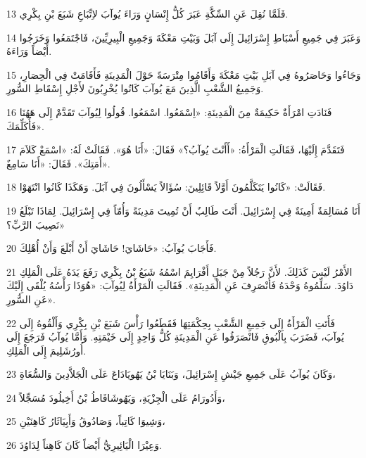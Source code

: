 \par 13 فَلَمَّا نُقِلَ عَنِ السِّكَّةِ عَبَرَ كُلُّ إِنْسَانٍ وَرَاءَ يُوآبَ لاِتِّبَاعِ شَبَعَ بْنِ بِكْرِي.
\par 14 وَعَبَرَ فِي جَمِيعِ أَسْبَاطِ إِسْرَائِيلَ إِلَى آبَلَ وَبَيْتِ مَعْكَةَ وَجَمِيعِ الْبِيرِيِّينَ، فَاجْتَمَعُوا وَخَرَجُوا أَيْضاً وَرَاءَهُ.
\par 15 وَجَاءُوا وَحَاصَرُوهُ فِي آبَلِ بَيْتِ مَعْكَةَ وَأَقَامُوا مِتْرَسَةً حَوْلَ الْمَدِينَةِ فَأَقَامَتْ فِي الْحِصَارِ، وَجَمِيعُ الشَّعْبِ الَّذِينَ مَعَ يُوآبَ كَانُوا يُخْرِبُونَ لأَجْلِ إِسْقَاطِ السُّورِ.
\par 16 فَنَادَتِ امْرَأَةٌ حَكِيمَةٌ مِنَ الْمَدِينَةِ: «اِسْمَعُوا. اسْمَعُوا. قُولُوا لِيُوآبَ تَقَدَّمْ إِلَى هَهُنَا فَأُكَلِّمَكَ».
\par 17 فَتَقَدَّمَ إِلَيْهَا، فَقَالَتِ الْمَرْأَةُ: «أَأَنْتَ يُوآبُ؟» فَقَالَ: «أَنَا هُوَ». فَقَالَتْ لَهُ: «اسْمَعْ كَلاَمَ أَمَتِكَ». فَقَالَ: «أَنَا سَامِعٌ».
\par 18 فَقَالَتْ: «كَانُوا يَتَكَلَّمُونَ أَوَّلاً قَائِلِينَ: سُؤَالاً يَسْأَلُونَ فِي آبَلَ. وَهَكَذَا كَانُوا انْتَهَوْا.
\par 19 أَنَا مُسَالِمَةٌ أَمِينَةٌ فِي إِسْرَائِيلَ. أَنْتَ طَالِبٌ أَنْ تُمِيتَ مَدِينَةً وَأُمّاً فِي إِسْرَائِيلَ. لِمَاذَا تَبْلَعُ نَصِيبَ الرَّبِّ؟»
\par 20 فَأَجَابَ يُوآبُ: «حَاشَايَ! حَاشَايَ أَنْ أَبْلَعَ وَأَنْ أُهْلِكَ.
\par 21 الأَمْرُ لَيْسَ كَذَلِكَ. لأَنَّ رَجُلاً مِنْ جَبَلِ أَفْرَايِمَ اسْمُهُ شَبَعُ بْنُ بِكْرِي رَفَعَ يَدَهُ عَلَى الْمَلِكِ دَاوُدَ. سَلِّمُوهُ وَحْدَهُ فَأَنْصَرِفَ عَنِ الْمَدِينَةِ». فَقَالَتِ الْمَرْأَةُ لِيُوآبَ: «هُوَذَا رَأْسُهُ يُلْقَى إِلَيْكَ عَنِ السُّورِ».
\par 22 فَأَتَتِ الْمَرْأَةُ إِلَى جَمِيعِ الشَّعْبِ بِحِكْمَتِهَا فَقَطَعُوا رَأْسَ شَبَعَ بْنِ بِكْرِي وَأَلْقُوهُ إِلَى يُوآبَ، فَضَرَبَ بِالْبُوقِ فَانْصَرَفُوا عَنِ الْمَدِينَةِ كُلُّ وَاحِدٍ إِلَى خَيْمَتِهِ. وَأَمَّا يُوآبُ فَرَجَعَ إِلَى أُورُشَلِيمَ إِلَى الْمَلِكِ.
\par 23 وَكَانَ يُوآبُ عَلَى جَمِيعِ جَيْشِ إِسْرَائِيلَ، وَبَنَايَا بْنُ يَهُويَادَاعَ عَلَى الْجَلاَّدِينَ وَالسُّعَاةِ،
\par 24 وَأَدُورَامُ عَلَى الْجِزْيَةِ، وَيَهُوشَافَاطُ بْنُ أَخِيلُودَ مُسَجِّلاً،
\par 25 وَشِيوَا كَاتِباً، وَصَادُوقُ وَأَبِيَاثَارُ كَاهِنَيْنِ،
\par 26 وَعِيْرَا الْيَائِيرِيُّ أَيْضاً كَانَ كَاهِناً لِدَاوُدَ.

